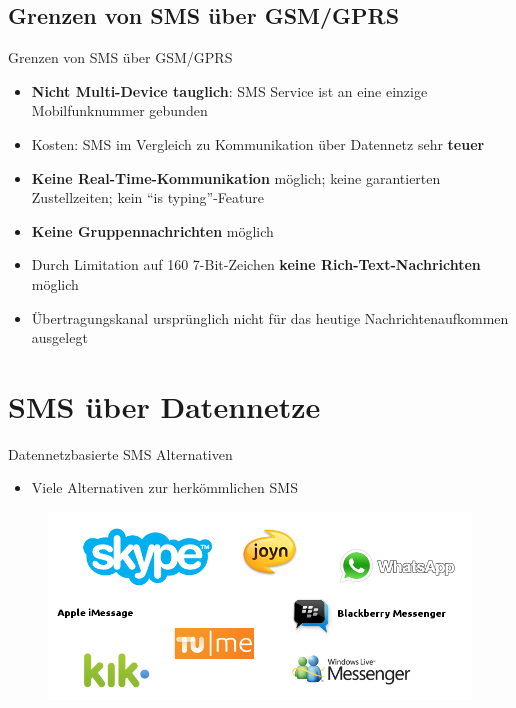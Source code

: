 \documentclass{beamer}
\begin{document}
\subsection{Grenzen von SMS über GSM/GPRS}
\begin{frame}{Grenzen von SMS über GSM/GPRS}
	\begin{itemize}
		\item \textbf{Nicht Multi-Device tauglich}: SMS Service ist an eine einzige 
			Mobilfunknummer gebunden
		\item Kosten: SMS im Vergleich zu Kommunikation über Datennetz sehr 
			\textbf{teuer}
		\item \textbf{Keine Real-Time-Kommunikation} möglich; keine garantierten Zustellzeiten; 
			kein ``is typing''-Feature
		\item \textbf{Keine Gruppennachrichten} möglich
		\item Durch Limitation auf 160 7-Bit-Zeichen \textbf{keine Rich-Text-Nachrichten} 
			möglich
		\item Übertragungskanal ursprünglich nicht für das heutige 
			Nachrichtenaufkommen ausgelegt
	\end{itemize}
\end{frame}


\section{SMS über Datennetze}
\begin{frame}{Datennetzbasierte SMS Alternativen}
	\begin{itemize}
		\item Viele Alternativen zur herkömmlichen SMS
	\end{itemize}
	\begin{figure}[htm]
		\includegraphics[width=\textwidth]{img/messengers.png}
		\label{messengers}
	\end{figure}
\end{frame}
\end{document}
